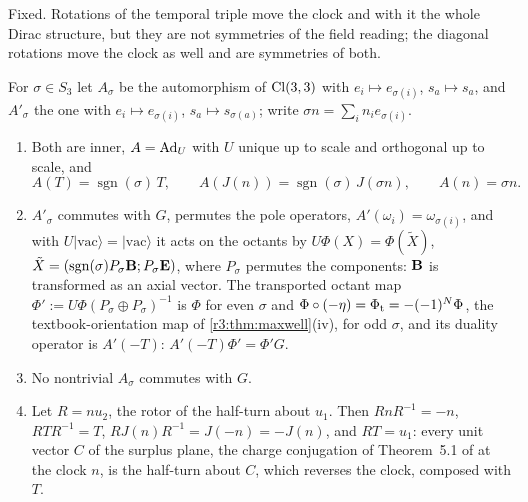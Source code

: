 Fixed. Rotations of the temporal triple move the clock and with it the whole Dirac structure, but they are not symmetries of the field reading;
the diagonal rotations move the clock as well and are symmetries of both.

\begin{proposition}
\label{r4:prop:perm}
For $\sigma\in S_3$ let $A_\sigma$ be the automorphism of $\mathrm{Cl}(3,3)$ with $e_i\mapsto e_{\sigma(i)}$, $s_a\mapsto s_a$, and $A'_\sigma$ the one with
$e_i\mapsto e_{\sigma(i)}$, $s_a\mapsto s_{\sigma(a)}$; write $\sigma n=\sum_in_ie_{\sigma(i)}$.
\begin{enumerate}[label=(\roman*),leftmargin=2.2em]
\item Both are inner, $A=\operatorname{Ad}_U$ with $U$ unique up to scale and orthogonal up to scale, and
\[
A(T)=\operatorname{sgn}(\sigma)\,T,\qquad A(J(n))=\operatorname{sgn}(\sigma)\,J(\sigma n),\qquad A(n)=\sigma n .
\]
\item $A'_\sigma$ commutes with $G$, permutes the pole operators, $A'(\omega_i)=\omega_{\sigma(i)}$, and with $U|\mathrm{vac}\rangle=|\mathrm{vac}\rangle$ it acts on
the octants by $U\Phi(X)=\Phi(\tilde X)$, $\tilde X=(\operatorname{sgn}(\sigma)P_\sigma\mathbf B;P_\sigma\mathbf E)$, where $P_\sigma$ permutes the components: $\mathbf B$ is
transformed as an axial vector. The transported octant map $\Phi':=U\Phi(P_\sigma\oplus P_\sigma)^{-1}$ is $\Phi$ for even $\sigma$ and
$\Phi\circ(-\eta)=\Phi_{\rm t}=-(-1)^N\Phi$, the textbook-orientation map of \cref{r3:thm:maxwell}(iv), for odd $\sigma$, and its duality operator is
$A'(-T)$: $A'(-T)\Phi'=\Phi'G$.
\item No nontrivial $A_\sigma$ commutes with $G$.
\item Let $R=nu_2$, the rotor of the half-turn about $u_1$. Then $RnR^{-1}=-n$, $RTR^{-1}=T$, $RJ(n)R^{-1}=J(-n)=-J(n)$, and $RT=u_1$: every unit vector
$C$ of the surplus plane, the charge conjugation of Theorem~5.1 of \cite{ES17} at the clock $n$, is the half-turn about $C$, which reverses the
clock, composed with $T$.
\end{enumerate}
\end{proposition}


